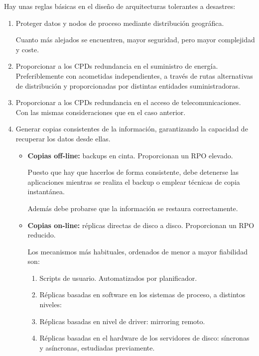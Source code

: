 Hay unas reglas básicas en el diseño de arquitecturas tolerantes a desastres:
\begin{enumerate}
\item Proteger datos y nodos de proceso mediante distribución geográfica.

Cuanto más alejados se encuentren, mayor seguridad, pero mayor
complejidad y coste.

\item Proporcionar a los CPDs redundancia en el suministro de energía.
Preferiblemente con acometidas independientes, a través de rutas alternativas de
distribución y proporcionadas por distintas entidades suministradoras.

\item Proporcionar a los CPDs redundancia en el acceso de telecomunicaciones. Con
las mismas consideraciones que en el caso anterior.

\item Generar copias consistentes de la información, garantizando la capacidad de
recuperar los datos desde ellas.
\begin{itemize}
\item \textbf{Copias off-line:} backups en cinta. Proporcionan un RPO elevado.

Puesto que hay que hacerlos de forma consistente, debe detenerse las aplicaciones mientras se realiza el backup o emplear técnicas de copia instantánea.

Además debe probarse que la información se restaura correctamente.

\item \textbf{Copias on-line:} réplicas directas de disco a disco. Proporcionan un RPO reducido.

Los mecanismos más habituales, ordenados de menor a mayor fiabilidad son:
\begin{enumerate}
\item Scripts de usuario. Automatizados por planificador.
\item Réplicas basadas en software en los sistemas de proceso, a distintos niveles:

\item Réplicas basadas en nivel de driver: mirroring remoto.
\item Réplicas basadas en el hardware de los servidores de disco: síncronas y
asíncronas, estudiadas previamente.
\end{enumerate}
\end{itemize}

\end{enumerate}

